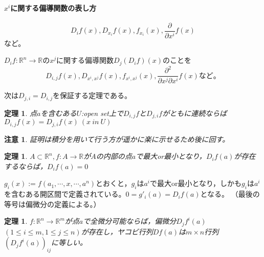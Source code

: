 \documentclass[dvipdfmx,a4j,10pt]{jsarticle}
\makeatletter
\theoremstyle{mystyle1}
\newtheorem{thm}[dfn]{定理}
\theoremstyle{mystyle2}
\newtheorem{note}{注意}
\renewenvironment{proof}[1][\proofname]{\par
  \pushQED{\qed}%
  \normalfont
  \topsep6\p@\@plus6\p@ \trivlist
  \item[\hskip\labelsep{\bfseries\sffamily #1}]\ignorespaces
}{%
  \popQED\endtrivlist\@endpefalse
}
\renewcommand\proofname{証明}
\makeatother
\begin{document}
\paragraph{$x^i$に関する偏導関数の表し方}
\[
D_if(x),D_{x_i}f(x),f_{x_i}(x),\frac{\partial}{\partial x^i}f(x)
\]
など。

$D_if:\mathbb{R}^n\to\mathbb{R}$の$x^j$に関する偏導関数$D_j(D_if)(x)$のことを
\[
D_{i,j}f(x),D_{x^i,x^j}f(x),f_{x^i,x^j}(x),\frac{\partial^2}{\partial x^j \partial x^i}f(x)
など。
\]

次は$D_{j,i}=D_{i,j}$を保証する定理である。
\begin{framed}
	\begin{thm}\label{th2.5}
		点$a$を含むある$U$:open set上で$D_{i,j}f$と$D_{j,i}f$がともに連続ならば$D_{i,j}f(x)=D_{j,i}f(x)\ (x\ in\ U)$
	\end{thm}
\end{framed}
\begin{note}
証明は積分を用いて行う方が遥かに楽に示せるため後に回す。
\end{note}

\begin{framed}
	\begin{thm}\label{th2.6}
		$A\subset\mathbb{R}^n,f:A\to\mathbb{R}$が$A$の内部の点$a$で最大or最小となり，$D_if(a)$が存在するならば，$D_if(a)=0$
	\end{thm}
\end{framed}

\begin{proof}
	$g_i(x):=f(a_1,\cdots,x,\cdots,a^n)$とおくと，$g_i$は$a^i$で最大or最小となり，しかも$g_i$は$a^i$を含むある開区間で定義されている。$0=g'_i(a)=D_if(a)$となる。	（最後の等号は偏微分の定義による。）
\end{proof}

\begin{framed}
	\begin{thm}
		$f:\mathbb{R}^n\to\mathbb{R}^m$が点$a$で全微分可能ならば，偏微分$D_jf^i(a)$ $(1\leq i \leq m,1\leq j \leq n)$が存在し，ヤコビ行列$Df(a)$は$m\times n$行列$(D_jf^i(a))_{ij}$に等しい。
	\end{thm}
\end{framed}
\end{document}
